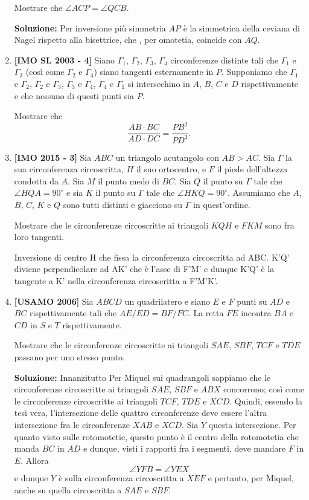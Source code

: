 \begin{enumerate}
	Mostrare che $\angle ACP = \angle QCB$.
	
	\textbf{Soluzione:} Per inversione più simmetria $AP$ è la simmetrica della ceviana di Nagel rispetto alla bisettrice, che , per omotetia, coincide con $AQ$.
	\item \textbf{[IMO SL 2003 - 4]}
	 Siano  $\Gamma_1$, $\Gamma_2$, $\Gamma_3$, $\Gamma_4$ 
	 circonferenze distinte tali che
	 $\Gamma_1$ e $\Gamma_3$ (così come $\Gamma_2$ e $\Gamma_4$) siano tangenti esternamente in $P$. Supponiamo che $\Gamma_1$ e $\Gamma_2$, $\Gamma_2$ e $\Gamma_3$, $\Gamma_3$ e $\Gamma_4$, $\Gamma_4$ e $\Gamma_1$ si intersechino in $A$, $B$, $C$ e $D$ rispettivamente e che nessuno di questi punti sia $P$.
	 
	 Mostrare che 
	 $$
	 \frac{AB\cdot BC}{AD\cdot DC}=\frac{PB^2}{PD^2} .
	 $$
	 
	 \item \textbf{[IMO 2015 - 3]} Sia $ABC$ un triangolo acutangolo con $AB > AC$. Sia $\Gamma$ la sua circonferenza circoscritta, $H$ il suo ortocentro, e $F$ il piede dell'altezza condotta da $A$. Sia $M$ il punto medo di $BC$. Sia $Q$ il punto su $\Gamma$ tale che $\angle HQA = 90^{\circ}$ e sia $K$ il punto su $\Gamma$ tale che $\angle HKQ = 90^{\circ}$. Assumiamo che $A$, $B$, $C$, $K$ e $Q$ sono tutti distinti e giacciono su $\Gamma$ in quest'ordine. 
	 
	 Mostrare che le circonferenze circoscritte ai triangoli $KQH$ e $FKM$ sono fra loro tangenti.
	 \begin{sol}Inversione di centro H che fissa la circonferenza circoscritta ad ABC. K'Q' diviene perpendicolare ad AK' che è l'asse di F'M' e dunque K'Q' è la tangente a K' nella circonferenza circoscritta a F'M'K'.
	 \end{sol}
 
 \item \textbf{[USAMO 2006]} 
 Sia $ABCD$ un quadrilatero e siano $E$ e $F$ punti su $AD$ e $BC$ rispettivamente tali che $AE/ED=BF/FC$.
 La retta $FE$ incontra $BA$ e $CD$ in $S$ e $T$ rispettivamente. 
 
 Mostrare che le circonferenze circoscritte ai triangoli $SAE$, $SBF$, $TCF$ e $TDE$ passano per uno stesso punto.

 \textbf{Soluzione:} Innanzitutto Per Miquel sui quadrangoli sappiamo che le circonferenze circoscritte ai triangoli $SAE$, $SBF$ e $ABX$ concorrono; così come le circonferenze circoscritte ai triangoli $TCF$, $TDE$ e $XCD$. Quindi, essendo la tesi vera, l'intersezione delle quattro circonferenze deve essere l'altra intersezione fra le circonferenze $XAB$ e $XCD$. Sia $Y$ questa intersezione. Per quanto visto sulle rotomotetie, questo punto è il centro della rotomotetia che manda $BC$ in $AD$ e dunque, visti i rapporti fra i segmenti, deve mandare $F$ in $E$. Allora 
 $$
 \angle YFB=\angle YEX
 $$
 e dunque $Y$ è sulla circonferenza circoscritta a $XEF$ e pertanto, per Miquel, anche su quella circoscritta a $SAE$ e $SBF$.
 

		
\end{enumerate}
